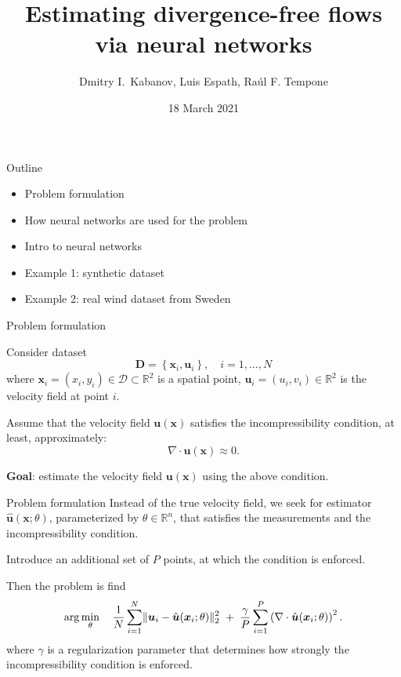 \documentclass{beamer}
\title{Estimating divergence-free flows via neural networks}
\author{Dmitry I.\ Kabanov, Luis Espath, Ra\'ul F. Tempone}
\institute{}
\date{18 March 2021}
\renewcommand{\vec}[1]{\boldsymbol{#1}}
\newcommand{\R}{\mathbb R}
\DeclarePairedDelimiter\norm{\lVert}{\rVert}
\begin{document}
\maketitle

\begin{frame}{Outline}
\begin{itemize}
    \item Problem formulation
    \item How neural networks are used for the problem
    \item Intro to neural networks
    \item Example 1: synthetic dataset
    \item Example 2: real wind dataset from Sweden
\end{itemize}
\end{frame}

\begin{frame}{Problem formulation}

Consider dataset
\[
    \vec{D} = \left\{\vec{x}_i, \vec{u}_i\right\}, \quad i = 1, ..., N
\]
where $\vec{x}_i = (x_i, y_i) \in \mathcal D \subset \R^2$ is a spatial point,
$\vec{u}_i = (u_i, v_i) \in \R^2$ is the velocity field at point $i$.

Assume that the velocity field $\vec u (\vec x)$ satisfies the incompressibility
condition, at least, approximately:
\[
    \nabla \cdot \vec u (\vec x) \approx 0.
\]

\textbf{Goal}: estimate the velocity field $\vec u  (\vec x)$ using the above
condition.
\end{frame}

\begin{frame}{Problem formulation}
Instead of the true velocity field, we seek for estimator
$\hat{\vec u} (\vec x; \theta)$,
parameterized by $\theta \in \R^n$, that satisfies
the measurements and the incompressibility condition.

Introduce an additional set of $P$ points, at which the condition is enforced.

Then the problem is find
\[
    \arg \min_\theta \quad
        \frac{1}{N} \sum_{i=1}^N \norm{\vec u_i - \hat{\vec u}(\vec x_i; \theta)}^2_2
        \ + \;
        \frac{\gamma}{P} \sum_{i=1}^P \left( \nabla \cdot \hat{\vec u}(\vec x_i; \theta)\right)^2.
\]
where $\gamma$ is a regularization parameter that determines how strongly
the incompressibility condition is enforced.
\end{frame}
\end{document}

